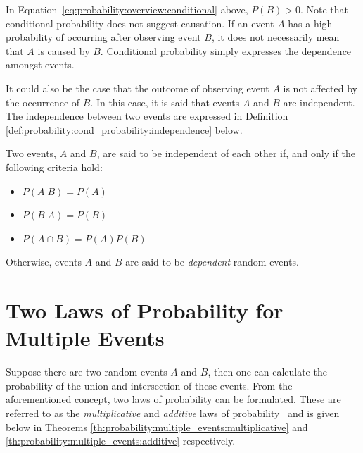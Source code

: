 In Equation~\eqref{eq:probability:overview:conditional} above, $P(B) > 0$. Note that conditional probability does not suggest causation. If an event $A$ has a high probability of occurring after observing event $B$, it does not necessarily mean that $A$ is caused by $B$. Conditional probability simply expresses the dependence amongst events.

It could also be the case that the outcome of observing event $A$ is not affected by the occurrence of $B$. In this case, it is said that events $A$ and $B$ are independent. The independence between two events are expressed in Definition \ref{def:probability:cond_probability:independence} below.
\\
\begin{definition}
      \label{def:probability:cond_probability:independence}
      Two events, $A$ and $B$, are said to be independent of each other if, and only if the following criteria hold:

      \begin{itemize}
            \item $P(A \vert B) = P(A)$
            \item $P(B \vert A) = P(B)$
            \item $P(A \cap B) = P(A)P(B)$
      \end{itemize}

      Otherwise, events $A$ and $B$ are said to be \textit{dependent} random events.
\end{definition}

\section{Two Laws of Probability for Multiple Events}\label{sec:probability:multiple_events}

Suppose there are two random events $A$ and $B$, then one can calculate the probability of the union and intersection of these events. From the aforementioned concept, two laws of probability can be formulated. These are referred to as the \textit{multiplicative} and \textit{additive} laws of probability~\cite{ref:wackerly:2014} and is given below in Theorems \ref{th:probability:multiple_events:multiplicative} and \ref{th:probability:multiple_events:additive} respectively.\\

